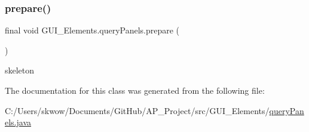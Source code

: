 \subsubsection{\texorpdfstring{prepare()}{prepare()}}
{\footnotesize\ttfamily final void G\+U\+I\+\_\+\+Elements.\+query\+Panels.\+prepare (\begin{DoxyParamCaption}{ }\end{DoxyParamCaption})}



skeleton 



The documentation for this class was generated from the following file\+:\begin{DoxyCompactItemize}
\item 
C\+:/\+Users/skwow/\+Documents/\+Git\+Hub/\+A\+P\+\_\+\+Project/src/\+G\+U\+I\+\_\+\+Elements/\hyperlink{query_panels_8java}{query\+Panels.\+java}\end{DoxyCompactItemize}
